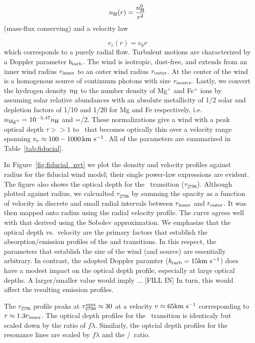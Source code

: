 \documentclass[12pt,preprint]{aastex}
\begin{document}
{\begin{equation}
n_{\rm H} (r) = \frac{n^0_{\rm H}}{r^2}
\end{equation}
(mass-flux conserving) and a velocity law

\begin{equation}
v_r (r) = v_0 r
\end{equation}
which corresponds to a purely radial flow.  Turbulent motions are
characterized by a Doppler parameter $b_{\rm turb}$.  
The wind is isotropic, dust-free, and extends from an inner wind
radius $r_{\rm inner}$ to an outer wind radius $r_{\rm outer}$.  At
the center of the wind 
is a homogenous source of continuum photons with size $r_{\rm source}$.  Lastly,
we convert the hydrogen density $n_{\rm H}$ to the number density of
Mg$^+$ and Fe$^+$ ions by assuming solar relative abundances with an
absolute metallicity of 1/2 solar and depletion factors of 1/10 and
1/20 for Mg and Fe respectively, i.e.\  $n_{\rm Mg^+} = 10^{-5.47} n_{\rm H}$ 
and \nfe=\nmg/2.   
These normalizations give a wind with a peak optical depth $\tau
>> 1$ to \mgiia\ that becomes optically thin over a velocity range
spanning $v_r \approx 100 - 1000 \, {\rm km~s^{-1}}$.  
All of the parameters are summarized in Table~\ref{tab:fiducial}.  

In Figure~\ref{fig:fiducial_nvt} we plot the density and velocity
profiles against radius for the fiducial wind model;  
their single power-law expressions are evident.  The figure also
shows the optical depth for the \mgiia\ transition ($\tau_{2796}$).
Although plotted against radius, we calcualted $\tau_{2796}$ by
summing the opacity as a function of velocity in discrete and small radial intervals
between $r_{\rm inner}$  and $r_{\rm outer}$.   It was then mapped
onto radius using the radial velocity profile. 
The curve agrees well with that derived using the Sobolev approximation.
We emphasize that the optical depth vs.\ velocity are the primary
factors that establish the absorption/emission profiles of the
 and  transitions.  In this respect, the 
parameters that establish the size of the wind (and source) are
essentially arbitrary.   In contrast, the adopted Doppler paramter
($b_{\rm turb} = 15 {\rm km~s^{-1}}$) does have a modest impact on the optical
depth profile, especially at large optical depths.  A larger/smaller
value would imply ... [FILL IN]
In turn, this would affect the resulting emission profiles.

The $\tau_{2796}$ profile peaks at $\tau_{2796}^{\rm max} \approx 30$
at a velocity $v \approx 65 {\rm km~s^{-1}}$ corresponding to $r \approx 1.3
r_{\rm inner}$.  The optical depth profiles for the \mgiib\ transition
is identicaly but scaled down by the ratio of $f\lambda$.  Similarly,
the optcial depth profiles for the  resonance lines are
scaled by $f \lambda$ and the \nfe/\nmg\ ratio.  

}
\end{document}

